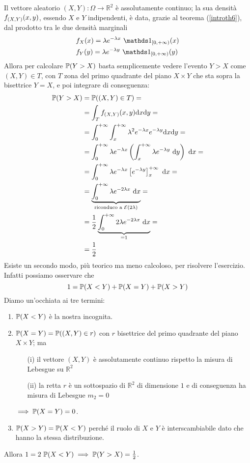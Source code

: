 \Soluzione{}
Il vettore aleatorio $(X,Y):\Omega\to\mathbb{R}^2$ è assolutamente continuo; la sua densità $f_{(X,Y)}(x,y)$, essendo $X$ e $Y$ indipendenti, è data, grazie al  teorema (\ref{introth6}), dal prodotto tra le due densità marginali
\begin{gather*}
\begin{aligned}
&f_X(x)=\lambda e^{-\lambda x}\ \Ind_{[0,+\infty)}(x) \\
&f_Y(y)=\lambda e^{-\lambda y}\ \Ind_{[0,+\infty)}(y)
\end{aligned}
\end{gather*}
Allora per calcolare $\mathbb{P}(Y>X)$ basta semplicemente vedere l'evento $Y>X$ come $(X,Y)\in T$, con $T$ zona del primo quadrante del piano $X\times Y$ che sta sopra la bisettrice $Y=X$, e poi integrare di conseguenza:
\begin{gather*}
\begin{aligned}
\mathbb{P}(Y>X)&=\mathbb{P}((X,Y)\in T)= \\
&=\int_T f_{(X,Y)}(x,y) \mathrm{d} x \mathrm{d} y= \\
&=\int_0^{+\infty} \int_{x}^{+\infty}\lambda^2e^{-\lambda x}e^{-\lambda y}\mathrm{d} x \mathrm{d} y= \\
&=\int_0^{+\infty}\lambda e^{-\lambda x} \left(\int_{x}^{+\infty} \lambda e^{-\lambda y}  \text{ d}y  \right)\text{ d}x= \\
&=\int_0^{+\infty}\lambda e^{-\lambda x} \left[ e^{-\lambda y}  \right]_x^{+\infty}\text{ d}x=\\
&=\underbrace{\int_0^{+\infty}\lambda e^{-2\lambda x}\text{ d}x}_{\text{riconduco a }\mathcal{E}(2\lambda)}=\\
&=\frac{1}{2}\underbrace{\int_0^{+\infty}2\lambda e^{-2\lambda x}\text{ d}x}_{=1}=\\
&=\frac{1}{2}
\end{aligned}
\end{gather*}
Esiste un secondo modo, più teorico ma meno calcoloso, per risolvere l'esercizio. Infatti possiamo osservare che
\begin{equation*}
1=\mathbb{P}(X<Y)+\mathbb{P}(X=Y)+\mathbb{P}(X>Y)
\end{equation*}
Diamo un'occhiata ai tre termini:
\begin{enumerate}
\item $\mathbb{P}(X<Y)$ è la nostra incognita.
\item $\mathbb{P}(X=Y)=\mathbb{P}((X,Y)\in r)$ con $r$ bisettrice del primo quadrante del piano $X\times Y$; ma
\begin{enumerate} 
\item [(i)] il vettore $(X,Y)$ è assolutamente continuo rispetto la misura di Lebesgue su $\mathbb{R}^2$
\item [(ii)] la retta $r$ è un sottospazio di $\mathbb{R}^2$ di dimensione $1$ e di conseguenza ha misura di Lebesgue $m_2=0$
\end{enumerate}
$\implies \mathbb{P}(X=Y)=0$.
\item $\mathbb{P}(X>Y)=\mathbb{P}(X<Y)$ perché il ruolo di $X$ e $Y$ è interscambiabile dato che hanno la stessa distribuzione.
\end{enumerate}
Allora $1=2\ \mathbb{P}(X<Y) \implies \mathbb{P}(Y>X)=\frac{1}{2}$.

